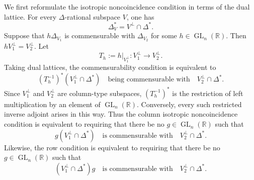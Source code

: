 \documentclass[reqno,11pt]{amsart}
\numberwithin{equation}{section}
\theoremstyle{definition}
\theoremstyle{remark}
\newcommand{\op}{\operatorname}
\newcommand{\GL}{\op{GL}}
\begin{document}
We first reformulate the isotropic noncoincidence condition in terms of the
dual lattice. For every $\Delta$-rational subspace $V$, one has
$$
\Delta_V^*=V^\perp\cap\Delta^*.
$$
Suppose that $h\Delta_{V_1}$ is commensurable with $\Delta_{V_2}$ for
some $h\in\GL_n(\mathbb R)$. Then $hV_1^\perp=V_2^\perp$. Let
$$
T_h:=h|_{V_1^\perp}:V_1^\perp\to V_2^\perp.
$$
Taking dual lattices, the commensurability condition is equivalent to
$$
(T_h^{-1})^*(V_1^\perp\cap\Delta^*)
\quad\text{being commensurable with}\quad
V_2^\perp\cap\Delta^*.
$$
Since $V_1^\perp$ and $V_2^\perp$ are column-type subspaces,
$(T_h^{-1})^*$ is the restriction of left multiplication by an element of
$\GL_n(\mathbb R)$. Conversely, every such restricted inverse adjoint arises
in this way. Thus the column isotropic noncoincidence condition is
equivalent to requiring that there be no $g\in\GL_n(\mathbb R)$ such that
$$
g(V_1^\perp\cap\Delta^*)
\quad\text{is commensurable with}\quad
V_2^\perp\cap\Delta^*.
$$
Likewise, the row condition is equivalent to requiring that there be no
$g\in\GL_n(\mathbb R)$ such that
$$
(V_1^\perp\cap\Delta^*)g
\quad\text{is commensurable with}\quad
V_2^\perp\cap\Delta^*.
$$
\end{document}
